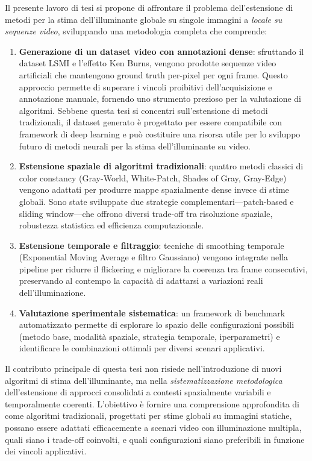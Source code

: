 Il presente lavoro di tesi si propone di affrontare il problema dell'estensione di metodi per la stima dell'illuminante globale su singole immagini a \emph{locale su sequenze video}, sviluppando una metodologia completa che comprende:

\begin{enumerate}
    \item \textbf{Generazione di un dataset video con annotazioni dense}: sfruttando il dataset LSMI e l'effetto Ken Burns, vengono prodotte sequenze video artificiali che mantengono ground truth per-pixel per ogni frame. Questo approccio permette di superare i vincoli proibitivi dell'acquisizione e annotazione manuale, fornendo uno strumento prezioso per la valutazione di algoritmi. Sebbene questa tesi si concentri sull'estensione di metodi tradizionali, il dataset generato è progettato per essere compatibile con framework di deep learning e può costituire una risorsa utile per lo sviluppo futuro di metodi neurali per la stima dell'illuminante su video.

    \item \textbf{Estensione spaziale di algoritmi tradizionali}: quattro metodi classici di color constancy (Gray-World, White-Patch, Shades of Gray, Gray-Edge) vengono adattati per produrre mappe spazialmente dense invece di stime globali. Sono state sviluppate due strategie complementari---patch-based e sliding window---che offrono diversi trade-off tra risoluzione spaziale, robustezza statistica ed efficienza computazionale.

    \item \textbf{Estensione temporale e filtraggio}: tecniche di smoothing temporale (Exponential Moving Average e filtro Gaussiano) vengono integrate nella pipeline per ridurre il flickering e migliorare la coerenza tra frame consecutivi, preservando al contempo la capacità di adattarsi a variazioni reali dell'illuminazione.

    \item \textbf{Valutazione sperimentale sistematica}: un framework di benchmark automatizzato permette di esplorare lo spazio delle configurazioni possibili (metodo base, modalità spaziale, strategia temporale, iperparametri) e identificare le combinazioni ottimali per diversi scenari applicativi.
\end{enumerate}

Il contributo principale di questa tesi non risiede nell'introduzione di nuovi algoritmi di stima dell'illuminante, ma nella \emph{sistematizzazione metodologica} dell'estensione di approcci consolidati a contesti spazialmente variabili e temporalmente coerenti. L'obiettivo è fornire una comprensione approfondita di come algoritmi tradizionali, progettati per stime globali su immagini statiche, possano essere adattati efficacemente a scenari video con illuminazione multipla, quali siano i trade-off coinvolti, e quali configurazioni siano preferibili in funzione dei vincoli applicativi.

